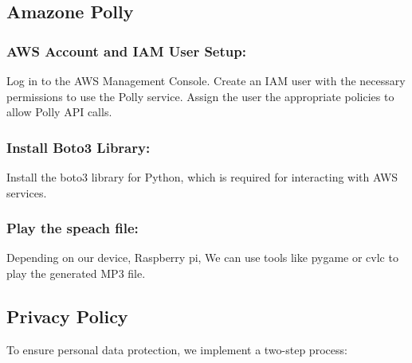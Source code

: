 \subsection{\textbf{Amazone Polly}}
\subsubsection{AWS Account and IAM User Setup:}
Log in to the AWS Management Console.
Create an IAM user with the necessary permissions to use the Polly service. Assign the user the appropriate policies to allow Polly API calls.
\subsubsection{Install Boto3 Library:}
Install the boto3 library for Python, which is required for interacting with AWS services.
\subsubsection{Play the speach file:}
Depending on our device, Raspberry pi, We can use tools like pygame or cvlc to play the generated MP3 file.



\subsection{\textbf{Privacy Policy}}
To ensure personal data protection, we implement a two-step process:\\


